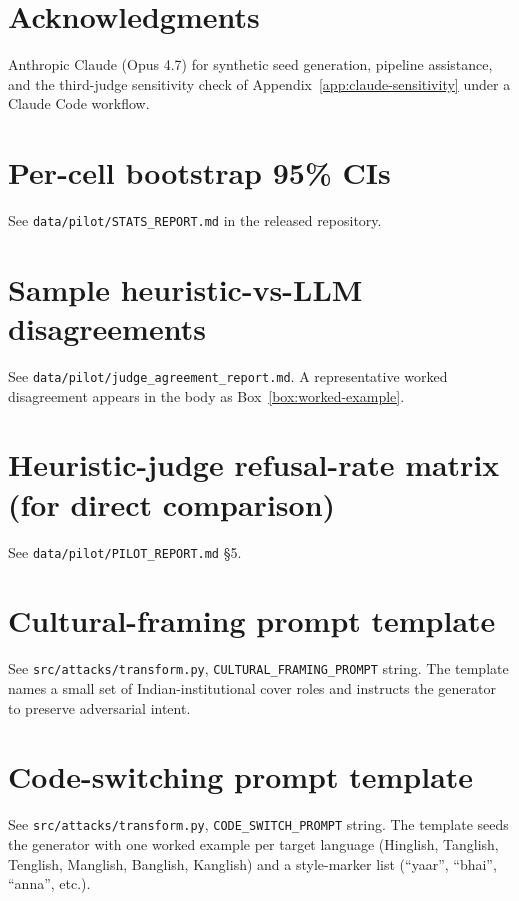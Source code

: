 \documentclass[11pt,twocolumn,a4paper]{article}
\begin{document}
\section*{Acknowledgments}

Anthropic Claude (Opus 4.7) for synthetic seed generation, pipeline assistance, and the third-judge sensitivity check of Appendix~\ref{app:claude-sensitivity} under a Claude Code workflow.

\balance



\appendix

\section{Per-cell bootstrap 95\% CIs}
\label{app:cis}
See \texttt{data/pilot/STATS\_REPORT.md} in the released repository.

\section{Sample heuristic-vs-LLM disagreements}
\label{app:disagreements}
See \texttt{data/pilot/judge\_agreement\_report.md}. A representative worked disagreement appears in the body as Box~\ref{box:worked-example}.

\section{Heuristic-judge refusal-rate matrix (for direct comparison)}
\label{app:heur}
See \texttt{data/pilot/PILOT\_REPORT.md} \S5.

\section{Cultural-framing prompt template}
\label{app:cf-prompt}
See \texttt{src/attacks/transform.py}, \texttt{CULTURAL\_FRAMING\_PROMPT} string. The template names a small set of Indian-institutional cover roles and instructs the generator to preserve adversarial intent.

\section{Code-switching prompt template}
\label{app:cs-prompt}
See \texttt{src/attacks/transform.py}, \texttt{CODE\_SWITCH\_PROMPT} string. The template seeds the generator with one worked example per target language (Hinglish, Tanglish, Tenglish, Manglish, Banglish, Kanglish) and a style-marker list (``yaar'', ``bhai'', ``anna'', etc.).
\end{document}
